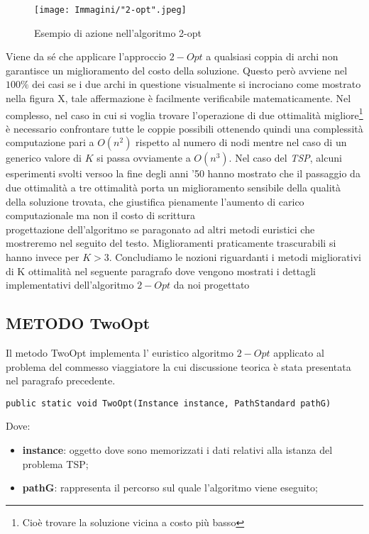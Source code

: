 \documentclass[11pt]{article}
\begin{document}
\begin{figure}[htbp]
    \centering
    \texttt{[image: Immagini/"2-opt".jpeg]}
    \caption{Esempio di azione nell'algoritmo 2-opt}
\end{figure}

Viene da sé che applicare l'approccio $2-Opt$ a qualsiasi coppia di archi non garantisce un miglioramento del costo della soluzione. Questo però avviene nel $100\%$ dei casi se i due archi in questione visualmente si incrociano come mostrato nella figura X, tale affermazione è facilmente verificabile matematicamente.
Nel complesso, nel caso in cui si voglia trovare l'operazione di due ottimalità migliore\footnote{Cioè trovare la soluzione vicina a costo più basso} è necessario confrontare tutte le coppie possibili ottenendo quindi una complessità computazione pari a $O(n^2)$ rispetto al numero di nodi mentre nel caso di un generico valore di $K$ si passa ovviamente a $O(n^3)$.
Nel caso del \textit{TSP}, alcuni esperimenti svolti versoo la fine degli anni '50 hanno mostrato che il passaggio da due ottimalità a tre ottimalità porta un miglioramento sensibile della qualità della soluzione trovata, che giustifica pienamente l'aumento di carico computazionale ma non il costo di scrittura\\progettazione dell'algoritmo se paragonato ad altri metodi euristici che mostreremo nel seguito del testo. Miglioramenti praticamente trascurabili si hanno invece per $K > 3$. 
Concludiamo le nozioni riguardanti i metodi migliorativi di K ottimalità nel seguente paragrafo dove vengono mostrati i dettagli implementativi dell'algoritmo $2-Opt$ da noi progettato

\subsection*{METODO TwoOpt}
\label{sec:DueOptS}

Il metodo TwoOpt implementa l' euristico algoritmo $2-Opt$ applicato al problema del commesso viaggiatore la cui discussione teorica è stata presentata nel paragrafo precedente.

\begin{lstlisting}
public static void TwoOpt(Instance instance, PathStandard pathG)
\end{lstlisting}

Dove:

\begin{itemize}
    \item \textbf{instance}: oggetto dove sono memorizzati i dati relativi alla istanza del problema TSP;
    \item \textbf{pathG}: rappresenta il percorso sul quale l'algoritmo viene eseguito;
\end{itemize}
\end{document}
